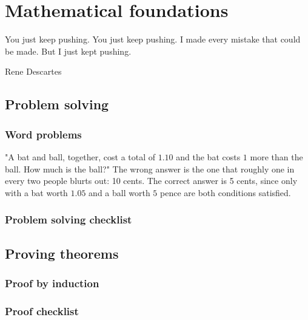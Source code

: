\chapter{Mathematical foundations}

\epigraph{You just keep pushing. You just keep pushing. I made every mistake that could be made. But I just kept pushing.}{Rene Descartes}

\section{Problem solving}
\subsection{Word problems}
"A bat and ball, together, cost a total of $1.10$ and the bat costs $1$ more than the ball. How much is the ball?" The wrong answer is the one that roughly one in every two people blurts out: 10 cents. The correct answer is 5 cents, since only with a bat worth $1.05$ and a ball worth $5$ pence are both conditions satisfied.

\subsection{Problem solving checklist}

\section{Proving theorems}
\subsection{Proof by induction}
\subsection{Proof checklist}
